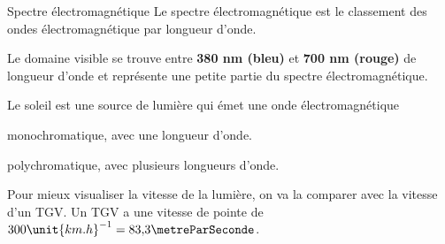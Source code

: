 \begin{doc}{Spectre électromagnétique}
  Le spectre électromagnétique est le classement des ondes électromagnétique par longueur d'onde. 
  \begin{center}
  \end{center}
  Le domaine visible se trouve entre \textbf{380 nm (bleu)} et \textbf{700 nm (rouge)} de longueur d'onde et représente une petite partie du spectre électromagnétique.
\end{doc}


\numeroQuestion
  Le soleil est une source de lumière qui émet une onde électromagnétique
\vspace*{-2pt}
\begin{qcm}
  \item monochromatique, avec une longueur d'onde.
  \item polychromatique, avec plusieurs longueurs d'onde.
\end{qcm}

Pour mieux visualiser la vitesse de la lumière, on va la comparer avec la vitesse d'un TGV.
Un TGV a une vitesse de pointe de $300 \unit{km.h}^{-1} = 83,\!3 \metreParSeconde$.
  



